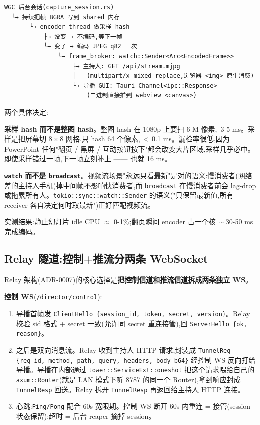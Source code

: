 \begin{lstlisting}
WGC 后台会话(capture_session.rs)
  └→ 持续把帧 BGRA 写到 shared 内存
       └→ encoder thread 做采样 hash
           ├→ 没变 → 不编码,等下一帧
           └→ 变了 → 编码 JPEG q82 一次
               └→ frame_broker: watch::Sender<Arc<EncodedFrame>>
                   ├→ 主持人: GET /api/stream.mjpg
                   │   (multipart/x-mixed-replace,浏览器 <img> 原生消费)
                   └→ 导播 GUI: Tauri Channel<ipc::Response>
                       (二进制直接推到 webview <canvas>)
\end{lstlisting}

两个具体决定:

\textbf{采样 hash 而不是整图 hash}。整图 hash 在 1080p 上要扫 6 M 像素,~3-5 ms。采样是把屏幕切 8\,$\times$\,8 网格,只 hash 64 个像素,\,$<$\,0.1 ms。漏检率很低,因为 PowerPoint 任何"翻页 / 黑屏 / 互动按钮按下"都会改变大片区域,采样几乎必中。即使采样错过一帧,下一帧立刻补上 —— 也就 16 ms。

\textbf{\texttt{watch} 而不是 \texttt{broadcast}}。视频流场景"永远只看最新"是对的语义:慢消费者(网络差的主持人手机)掉中间帧不影响快消费者,而 \texttt{broadcast} 在慢消费者前会 lag-drop 或拖累所有人。\texttt{tokio::sync::watch::Sender} 的语义("只保留最新值,所有 receiver 各自决定何时取最新")正好匹配视频流。

实测结果:静止幻灯片 idle CPU $\approx$ 0-1\%;翻页瞬间 encoder 占一个核 \,$\sim$\,30-50 ms 完成编码。

\subsection{Relay 隧道:控制+推流分两条 WebSocket}

Relay 架构(ADR-0007)的核心选择是\textbf{把控制信道和推流信道拆成两条独立 WS}。

\textbf{控制 WS}(\texttt{/director/control}):

\begin{enumerate}
  \item 导播首帧发 \texttt{ClientHello \{session\_id, token, secret, version\}}。Relay 校验 sid 格式 + secret 一致(允许同 secret 重连接管),回 \texttt{ServerHello \{ok, reason\}}。
  \item 之后是双向消息流。Relay 收到主持人 HTTP 请求,封装成 \texttt{TunnelReq \{req\_id, method, path, query, headers, body\_b64\}} 经控制 WS 反向打给导播。导播在内部通过 \texttt{tower::ServiceExt::oneshot} 把这个请求喂给自己的 \texttt{axum::Router}(就是 LAN 模式下听 8787 的同一个 Router),拿到响应封成 \texttt{TunnelResp} 回送。Relay 拆开 \texttt{TunnelResp} 再返回给主持人 HTTP 连接。
  \item 心跳:\texttt{Ping/Pong} 配合 60s 宽限期。控制 WS 断开 60s 内重连 = 接管(session 状态保留);超时 = 后台 reaper 摘掉 session。
\end{enumerate}

